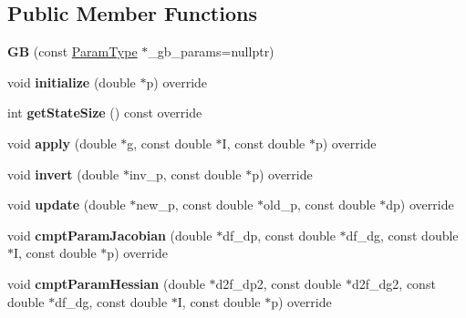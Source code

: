 \subsection*{Public Member Functions}
\begin{DoxyCompactItemize}
\item 
\hypertarget{classGB_a7692207db0c1e4dc3c89af8b9eb111bf}{{\bfseries G\-B} (const \hyperlink{structGBParams}{Param\-Type} $\ast$\-\_\-gb\-\_\-params=nullptr)}\label{classGB_a7692207db0c1e4dc3c89af8b9eb111bf}

\item 
\hypertarget{classGB_a775656c003d6b3c9a8ad9879ab7c7ca9}{void {\bfseries initialize} (double $\ast$p) override}\label{classGB_a775656c003d6b3c9a8ad9879ab7c7ca9}

\item 
\hypertarget{classGB_ab0cfbf84d291d17b93be0e6d483a09aa}{int {\bfseries get\-State\-Size} () const override}\label{classGB_ab0cfbf84d291d17b93be0e6d483a09aa}

\item 
\hypertarget{classGB_a40647dc4b03eec10d285fe962af24e6e}{void {\bfseries apply} (double $\ast$g, const double $\ast$I, const double $\ast$p) override}\label{classGB_a40647dc4b03eec10d285fe962af24e6e}

\item 
\hypertarget{classGB_abc254f11815b01d3ac6fcc49f4800139}{void {\bfseries invert} (double $\ast$inv\-\_\-p, const double $\ast$p) override}\label{classGB_abc254f11815b01d3ac6fcc49f4800139}

\item 
\hypertarget{classGB_a0c67cd2ac56b1e9ee6abfa925f84eec6}{void {\bfseries update} (double $\ast$new\-\_\-p, const double $\ast$old\-\_\-p, const double $\ast$dp) override}\label{classGB_a0c67cd2ac56b1e9ee6abfa925f84eec6}

\item 
\hypertarget{classGB_a5f044dfbaa8519503bfb19517e835b25}{void {\bfseries cmpt\-Param\-Jacobian} (double $\ast$df\-\_\-dp, const double $\ast$df\-\_\-dg, const double $\ast$I, const double $\ast$p) override}\label{classGB_a5f044dfbaa8519503bfb19517e835b25}

\item 
\hypertarget{classGB_a011223e61c83eec2809b2b898b6de52d}{void {\bfseries cmpt\-Param\-Hessian} (double $\ast$d2f\-\_\-dp2, const double $\ast$d2f\-\_\-dg2, const double $\ast$df\-\_\-dg, const double $\ast$I, const double $\ast$p) override}\label{classGB_a011223e61c83eec2809b2b898b6de52d}


\end{DoxyCompactItemize}
